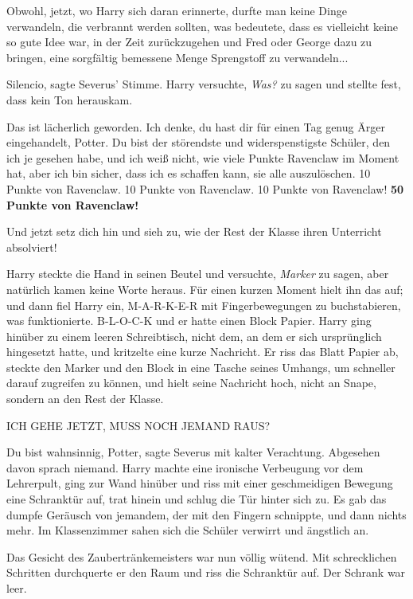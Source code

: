 Obwohl, jetzt, wo Harry sich daran erinnerte, durfte man keine Dinge verwandeln,
die verbrannt werden sollten, was bedeutete, dass es vielleicht keine so gute
Idee war, in der Zeit zurückzugehen und Fred oder George dazu zu bringen, eine
sorgfältig bemessene Menge Sprengstoff zu verwandeln...

\glqq Silencio\grqq{}, sagte Severus' Stimme. Harry versuchte, \glqq
\emph{Was?\grqq{}} zu sagen und stellte fest, dass kein Ton herauskam.

\glqq Das ist lächerlich geworden. Ich denke, du hast dir für einen Tag genug
Ärger eingehandelt, Potter. Du bist der störendste und widerspenstigste Schüler,
den ich je gesehen habe, und ich weiß nicht, wie viele Punkte Ravenclaw im
Moment hat, aber ich bin sicher, dass ich es schaffen kann, sie alle
auszulöschen. 10 Punkte von Ravenclaw. 10 Punkte von Ravenclaw. 10 Punkte von
Ravenclaw! \textbf{50 Punkte von Ravenclaw!}

Und jetzt setz dich hin und sieh zu, wie der Rest der Klasse ihren Unterricht
absolviert!\grqq{}

Harry steckte die Hand in seinen Beutel und versuchte, \glqq
\emph{Marker}\grqq{} zu sagen, aber natürlich kamen keine Worte heraus. Für
einen kurzen Moment hielt ihn das auf; und dann fiel Harry ein, M-A-R-K-E-R mit
Fingerbewegungen zu buchstabieren, was funktionierte. B-L-O-C-K und er hatte
einen Block Papier. Harry ging hinüber zu einem leeren Schreibtisch, nicht dem,
an dem er sich ursprünglich hingesetzt hatte, und kritzelte eine kurze
Nachricht. Er riss das Blatt Papier ab, steckte den Marker und den Block in eine
Tasche seines Umhangs, um schneller darauf zugreifen zu können, und hielt seine
Nachricht hoch, nicht an Snape, sondern an den Rest der Klasse.

ICH GEHE JETZT, MUSS NOCH JEMAND RAUS?

\glqq Du bist wahnsinnig, Potter\grqq{}, sagte Severus mit kalter Verachtung.
Abgesehen davon sprach niemand. Harry machte eine ironische Verbeugung vor dem
Lehrerpult, ging zur Wand hinüber und riss mit einer geschmeidigen Bewegung eine
Schranktür auf, trat hinein und schlug die Tür hinter sich zu. Es gab das dumpfe
Geräusch von jemandem, der mit den Fingern schnippte, und dann nichts mehr. Im
Klassenzimmer sahen sich die Schüler verwirrt und ängstlich an.

Das Gesicht des Zaubertränkemeisters war nun völlig wütend. Mit schrecklichen
Schritten durchquerte er den Raum und riss die Schranktür auf. Der Schrank war
leer.

